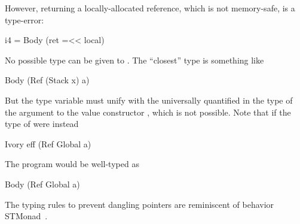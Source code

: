 However, returning a locally-allocated reference, which is not memory-safe, is a
type-error:
\begin{code}
i4 = Body (ret =<< local)
\end{code}
\noindent
No possible type can be given to .  The ``closest'' type is something
like
\begin{code}
Body (Ref (Stack x) a)
\end{code}
\noindent
But the type variable  must unify with the universally quantified
 in the type of the argument to the value constructor , which is
not possible.  Note that if the type of  were instead
\begin{code}
Ivory eff (Ref Global a)
\end{code}
\noindent
The program  would be well-typed as
\begin{code}
Body (Ref Global a)
\end{code}
\noindent
The typing rules to prevent dangling pointers are reminiscent of behavior
STMonad~\cite{stmonad}.









